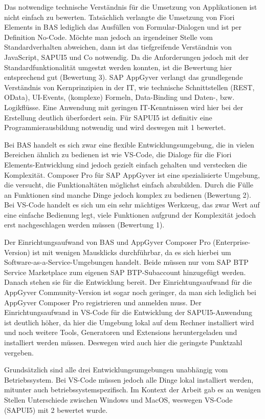 Das notwendige technische Verständnis für die Umsetzung von Applikationen ist nicht einfach zu bewerten. Tatsächlich verlangte die Umsetzung von Fiori Elements in BAS lediglich das Ausfüllen von Formular-Dialogen und ist per Definition No-Code. Möchte man jedoch an irgendeiner Stelle vom Standardverhalten abweichen, dann ist das tiefgreifende Verständnis von JavaScript, SAPUI5 und Co notwendig. Da die Anforderungen jedoch mit der Standardfunktionalität umgestzt werden konnten, ist die Bewertung hier entsprechend gut (Bewertung 3). SAP AppGyver verlangt das grundlegende Verständnis von Kernprinzipien in der IT, wie technische Schnittstellen (REST, OData), UI-Events, (komplexe) Formeln, Data-Binding und Daten-, bzw. Logikflüsse. Eine Anwendung mit geringen IT-Kenntnissen wird hier bei der Erstellung deutlich überfordert sein. Für SAPUI5 ist definitiv eine Programmierausbildung notwendig und wird deswegen mit 1 bewertet.

Bei BAS handelt es sich zwar eine flexible Entwicklungsumgebung, die in vielen Bereichen ähnlich zu bedienen ist wie VS-Code, die Dialoge für die Fiori Elements-Entwicklung sind jedoch gezielt einfach gehalten und verstecken die Komplexität. Composer Pro für SAP AppGyver ist eine spezialisierte Umgebung, die versucht, die Funktionaltäten möglichst einfach abzubilden. Durch die Fülle an Funktionen sind manche Dinge jedoch komplex zu bedienen (Bewertung 2). Bei VS-Code handelt es sich um ein sehr mächtiges Werkzeug, das zwar Wert auf eine einfache Bedienung legt, viele Funktionen aufgrund der Komplexität jedoch erst nachgeschlagen werden müssen (Bewertung 1).

Der Einrichtungsaufwand von BAS und AppGyver Composer Pro (Enterprise-Version) ist mit wenigen Mausklicks durchführbar, da es sich hierbei um Software-as-a-Service-Umgebungen handelt. Beide müssen nur vom SAP BTP Service Marketplace zum eigenen SAP BTP-Subaccount hinzugefügt werden. Danach stehen sie für die Entwicklung bereit. Der Einrichtungsaufwand für die AppGyver Community-Version ist sogar noch geringer, da man sich lediglich bei AppGyver Composer Pro registrieren und anmelden muss. Der Einrichtungsaufwand in VS-Code für die Entwicklung der SAPUI5-Anwendung ist deutlich höher, da hier die Umgebung lokal auf dem Rechner installiert wird und noch weitere Tools, Generatoren und Extensions heruntergeladen und installiert werden müssen. Deswegen wird auch hier die geringste Punktzahl vergeben.

Grundsätzlich sind alle drei Entwicklungsumgebungen unabhängig vom Betriebssystem. Bei VS-Code müssen jedoch alle Dinge lokal installiert werden, mitunter auch betriebssystemspezifisch. Im Kontext der Arbeit gab es an wenigen Stellen Unterschiede zwischen Windows und MacOS, weswegen VS-Code (SAPUI5) mit 2 bewertet wurde.

